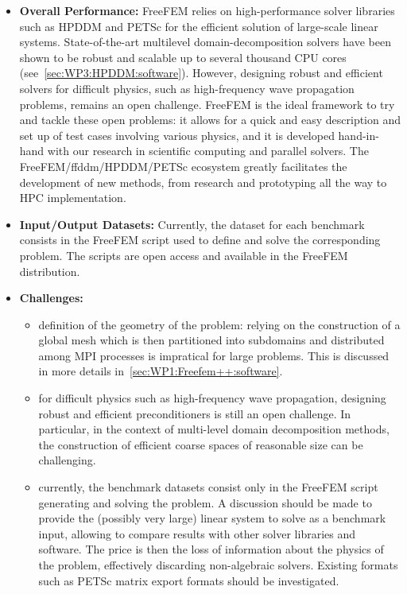 \begin{itemize}
    \item \textbf{Overall Performance:} FreeFEM relies on high-performance solver libraries such as HPDDM and PETSc for the efficient solution of large-scale linear systems. State-of-the-art multilevel domain-decomposition solvers have been shown to be robust and scalable up to several thousand CPU cores (see~\cref{sec:WP3:HPDDM:software}). However, designing robust and efficient solvers for difficult physics, such as high-frequency wave propagation problems, remains an open challenge. FreeFEM is the ideal framework to try and tackle these open problems: it allows for a quick and easy description and set up of test cases involving various physics, and it is developed hand-in-hand with our research in scientific computing and parallel solvers. The FreeFEM/ffddm/HPDDM/PETSc ecosystem greatly facilitates the development of new methods, from research and prototyping all the way to HPC implementation.
    \item \textbf{Input/Output Datasets:} Currently, the dataset for each benchmark consists in the FreeFEM script used to define and solve the corresponding problem. The scripts are open access and available in the FreeFEM distribution.
    \item \textbf{Challenges:}
        \begin{itemize}
        \item definition of the geometry of the problem: relying on the construction of a global mesh which is then partitioned into subdomains and distributed among MPI processes is impratical for large problems. This is discussed in more details in~\cref{sec:WP1:Freefem++:software}.
        \item for difficult physics such as high-frequency wave propagation, designing robust and efficient preconditioners is still an open challenge. In particular, in the context of multi-level domain decomposition methods, the construction of efficient coarse spaces of reasonable size can be challenging.
        \item currently, the benchmark datasets consist only in the FreeFEM script generating and solving the problem. A discussion should be made to provide the (possibly very large) linear system to solve as a benchmark input, allowing to compare results with other solver libraries and software. The price is then the loss of information about the physics of the problem, effectively discarding non-algebraic solvers. Existing formats such as PETSc matrix export formats should be investigated.

\end{itemize}
\end{itemize}
